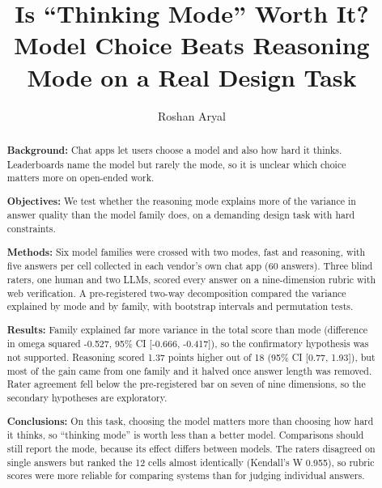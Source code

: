 \documentclass[manuscript, screen, review]{jair}
\begin{document}
\title[Is ``Thinking Mode'' Worth It?]{Is ``Thinking Mode'' Worth It? Model Choice Beats Reasoning Mode on a Real Design Task}

\author{Roshan Aryal}

\renewcommand{\shortauthors}{Aryal}

\begin{abstract}
{\bf Background:}
Chat apps let users choose a model and also how hard it thinks. Leaderboards name the model
but rarely the mode, so it is unclear which choice matters more on open-ended work.

{\bf Objectives:}
We test whether the reasoning mode explains more of the variance in answer quality than the
model family does, on a demanding design task with hard constraints.

{\bf Methods:}
Six model families were crossed with two modes, fast and reasoning, with five answers per
cell collected in each vendor's own chat app (60 answers). Three blind raters, one human and
two LLMs, scored every answer on a nine-dimension rubric with web verification. A
pre-registered two-way decomposition compared the variance explained by mode and by family,
with bootstrap intervals and permutation tests.

{\bf Results:}
Family explained far more variance in the total score than mode (difference in omega
squared -0.527, 95\% CI [-0.666, -0.417]), so the confirmatory hypothesis was not
supported. Reasoning scored 1.37 points higher out of 18 (95\% CI [0.77, 1.93]), but most of
the gain came from one family and it halved once answer length was removed. Rater agreement
fell below the pre-registered bar on seven of nine dimensions, so the secondary hypotheses
are exploratory.

{\bf Conclusions:}
On this task, choosing the model matters more than choosing how hard it thinks, so
``thinking mode'' is worth less than a better model. Comparisons should still report the
mode, because its effect differs between models. The raters disagreed on single answers but
ranked the 12 cells almost identically (Kendall's W 0.955), so rubric scores were more
reliable for comparing systems than for judging individual answers.
\end{abstract}

\maketitle
\end{document}
